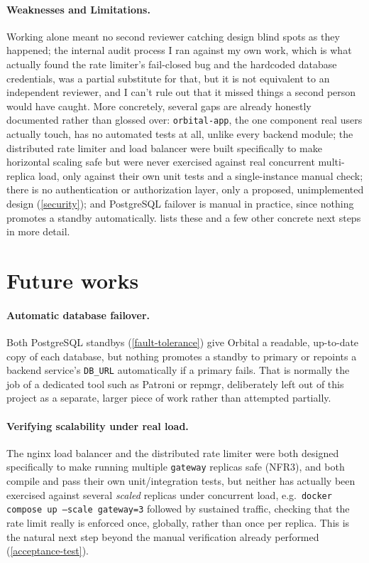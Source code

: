 \documentclass{scrartcl}
\begin{document}
\paragraph{Weaknesses and Limitations.} Working alone meant no second reviewer catching design
blind spots as they happened; the internal audit process I ran against my own work, which is what
actually found the rate limiter's fail-closed bug and the hardcoded database credentials, was a
partial substitute for that, but it is not equivalent to an independent reviewer, and I can't rule
out that it missed things a second person would have caught. More concretely, several gaps are
already honestly documented rather than glossed over: \texttt{orbital-app}, the one component
real users actually touch, has no automated tests at all, unlike every backend module; the
distributed rate limiter and load balancer were built specifically to make horizontal scaling
safe but were never exercised against real concurrent multi-replica load, only against their own
unit tests and a single-instance manual check; there is no authentication or authorization layer,
only a proposed, unimplemented design (\cref{security}); and PostgreSQL failover is manual in
practice, since nothing promotes a standby automatically.  lists these and a
few other concrete next steps in more detail.

\section{Future works}\label{future-works}

\paragraph{Automatic database failover.} Both PostgreSQL standbys (\cref{fault-tolerance}) give
Orbital a readable, up-to-date copy of each database, but nothing promotes a standby to primary
or repoints a backend service's \texttt{DB\_URL} automatically if a primary fails. That is
normally the job of a dedicated tool such as Patroni or repmgr, deliberately left out of this
project as a separate, larger piece of work rather than attempted partially.

\paragraph{Verifying scalability under real load.} The nginx load balancer and the distributed
rate limiter were both designed specifically to make running multiple \texttt{gateway} replicas
safe (NFR3), and both compile and pass their own unit/integration tests, but neither has actually
been exercised against several \emph{scaled} replicas under concurrent load, e.g.\
\texttt{docker compose up --scale gateway=3} followed by sustained traffic, checking that the
rate limit really is enforced once, globally, rather than once per replica. This is the natural
next step beyond the manual verification already performed (\cref{acceptance-test}).
\end{document}
